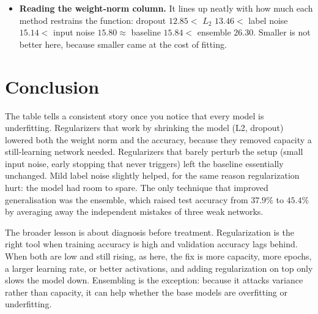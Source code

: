 \documentclass[12pt]{article}
\begin{document}
\begin{itemize}
      have different architectures and different random initialisations.
      Averaging their probabilities cancels the errors that disagree and keeps
      the predictions they agree on. This works even though each member is
      individually weak, which is the key lesson: ensembling reduces the
      variance part of the error and does not require any single model to be
      good. Its combined weight norm is large ($26.30$) only because it is
      literally three networks.
\item \textbf{Reading the weight-norm column.} It lines up neatly with how much
      each method restrains the function: dropout $12.85 <$ $L_2$ $13.46 <$
      label noise $15.14 <$ input noise $15.80 \approx$ baseline $15.84 <$
      ensemble $26.30$. Smaller is not better here, because smaller came at the
      cost of fitting.
\end{itemize}

\section{Conclusion}

The table tells a consistent story once you notice that every model is
underfitting. Regularizers that work by shrinking the model (L2, dropout)
lowered both the weight norm and the accuracy, because they removed capacity a
still-learning network needed. Regularizers that barely perturb the setup
(small input noise, early stopping that never triggers) left the baseline
essentially unchanged. Mild label noise slightly helped, for the same reason
regularization hurt: the model had room to spare. The only technique that
improved generalisation was the ensemble, which raised test accuracy from
$37.9\%$ to $45.4\%$ by averaging away the independent mistakes of three weak
networks.

The broader lesson is about diagnosis before treatment. Regularization is the
right tool when training accuracy is high and validation accuracy lags behind.
When both are low and still rising, as here, the fix is more capacity, more
epochs, a larger learning rate, or better activations, and adding regularization
on top only slows the model down. Ensembling is the exception: because it
attacks variance rather than capacity, it can help whether the base models are
overfitting or underfitting.

\end{document}
